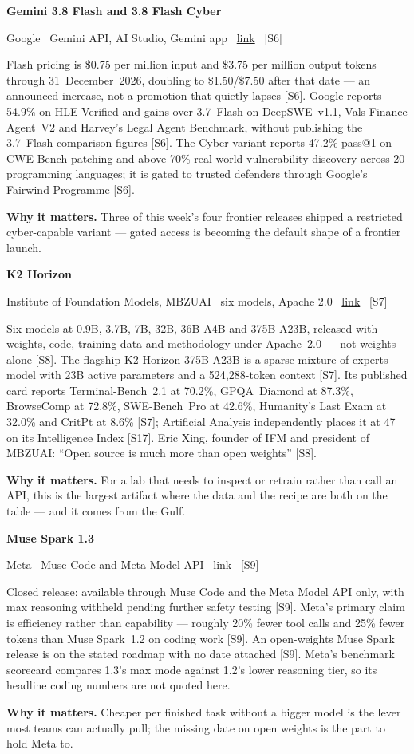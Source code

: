 \documentclass[11pt,a4paper]{article}
\newcommand{\entry}[4]{%
  \par\vspace{0.7em}%
  {\sffamily\bfseries\color{brandink}#1}\par
  {\footnotesize\color{brandgrey}#2 \textbullet\ \href{#3}{link} \textbullet\ \srcref{#4}}\par
  \vspace{0.15em}}
\newcommand{\why}[1]{\par{\small\textbf{Why it matters.} #1}\par}
\newcommand{\srcref}[1]{\textcolor{brandaccent}{[S#1]}}
\begin{document}
\entry{Gemini 3.8 Flash and 3.8 Flash Cyber}{Google \textbullet\ Gemini API, AI Studio, Gemini app}{https://blog.google/innovation-and-ai/models-and-research/gemini-models/3-8-flash-and-3-8-flash-cyber/}{6}
Flash pricing is \$0.75 per million input and \$3.75 per million output tokens through
31~December~2026, doubling to \$1.50/\$7.50 after that date --- an announced increase, not
a promotion that quietly lapses \srcref{6}. Google reports 54.9\% on HLE-Verified and gains
over 3.7~Flash on DeepSWE~v1.1, Vals Finance Agent~V2 and Harvey's Legal Agent Benchmark,
without publishing the 3.7~Flash comparison figures \srcref{6}. The Cyber variant reports
47.2\% pass@1 on CWE-Bench patching and above 70\% real-world vulnerability discovery
across 20 programming languages; it is gated to trusted defenders through Google's Fairwind
Programme \srcref{6}.
\why{Three of this week's four frontier releases shipped a restricted cyber-capable
variant --- gated access is becoming the default shape of a frontier launch.}

\entry{K2 Horizon}{Institute of Foundation Models, MBZUAI \textbullet\ six models, Apache 2.0}{https://huggingface.co/IFM/K2-Horizon-375B-A23B}{7}
Six models at 0.9B, 3.7B, 7B, 32B, 36B-A4B and 375B-A23B, released with weights, code,
training data and methodology under Apache~2.0 --- not weights alone \srcref{8}. The
flagship K2-Horizon-375B-A23B is a sparse mixture-of-experts model with 23B active
parameters and a 524{,}288-token context \srcref{7}. Its published card reports
Terminal-Bench~2.1 at 70.2\%, GPQA~Diamond at 87.3\%, BrowseComp at 72.8\%, SWE-Bench~Pro
at 42.6\%, Humanity's Last Exam at 32.0\% and CritPt at 8.6\% \srcref{7}; Artificial
Analysis independently places it at 47 on its Intelligence Index \srcref{17}. Eric Xing,
founder of IFM and president of MBZUAI: ``Open source is much more than open weights''
\srcref{8}.
\why{For a lab that needs to inspect or retrain rather than call an API, this is the
largest artifact where the data and the recipe are both on the table --- and it comes from
the Gulf.}

\entry{Muse Spark 1.3}{Meta \textbullet\ Muse Code and Meta Model API}{https://research.meta.ai/blog/introducing-muse-spark-1-3}{9}
Closed release: available through Muse Code and the Meta Model API only, with max
reasoning withheld pending further safety testing \srcref{9}. Meta's primary claim is
efficiency rather than capability --- roughly 20\% fewer tool calls and 25\% fewer tokens
than Muse Spark~1.2 on coding work \srcref{9}. An open-weights Muse Spark release is on
the stated roadmap with no date attached \srcref{9}. Meta's benchmark scorecard compares
1.3's max mode against 1.2's lower reasoning tier, so its headline coding numbers are not
quoted here.
\why{Cheaper per finished task without a bigger model is the lever most teams can actually
pull; the missing date on open weights is the part to hold Meta to.}
\end{document}
